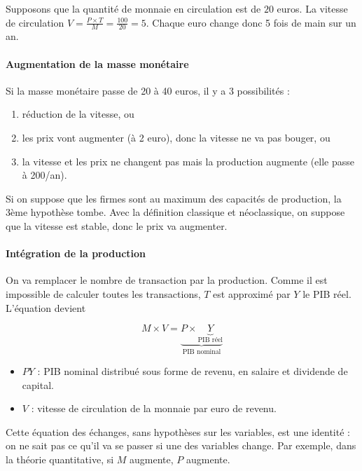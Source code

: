 	Supposons que la quantité de monnaie en circulation est de $20$ euros. La vitesse de circulation $V = \frac{P \times T}{M} = \frac{100}{20} = 5$. Chaque euro change donc 5 fois de main sur un an.
	
	\paragraph{Augmentation de la masse monétaire}
	
	Si la masse monétaire passe de 20 à 40 euros, il y a 3 possibilités :
	
	\begin{enumerate}
		\item réduction de la vitesse, ou
		\item les prix vont augmenter (à 2 euro), donc la vitesse ne va pas bouger, ou
		\item la vitesse et les prix ne changent pas mais la production augmente (elle passe à 200/an).
	\end{enumerate}
	
	Si on suppose que les firmes sont au maximum des capacités de production, la 3ème hypothèse tombe. Avec la définition classique et néoclassique, on suppose que la vitesse est stable, donc le prix va augmenter.
	
	\paragraph{Intégration de la production}
		
	On va remplacer le nombre de transaction par la production. Comme il est impossible de calculer toutes les transactions, $T$ est approximé par $Y$ le PIB réel. L'équation devient
	
	$$M \times V = \underbrace{P \times \underbrace{Y}_{\text{PIB réel}}}_{\text{PIB nominal}}$$
	
	\begin{itemize}
		\item $PY$ : PIB nominal distribué sous forme de revenu, en salaire et dividende de capital.
		\item $V$ : vitesse de circulation de la monnaie par euro de revenu.
	\end{itemize}
	
	Cette équation des échanges, sans hypothèses sur les variables, est une identité : on ne sait pas ce qu'il va se passer si une des variables change. Par exemple, dans la théorie quantitative, si $M$ augmente, $P$ augmente.
		
